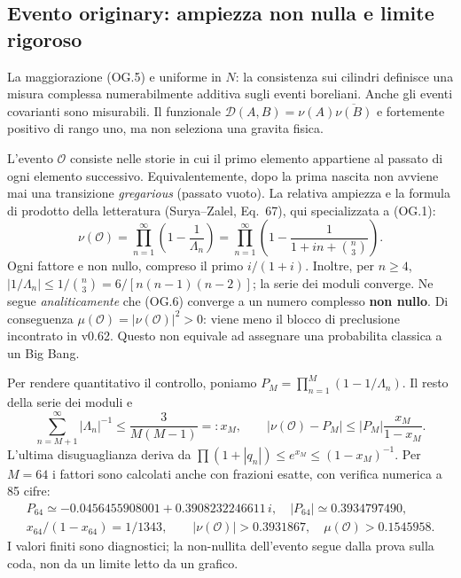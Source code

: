 \documentclass[11pt,a4paper]{article}
\begin{document}
\subsection*{Evento originary: ampiezza non nulla e limite rigoroso}
La maggiorazione (OG.5) e uniforme in $N$: la consistenza sui cilindri definisce una misura complessa numerabilmente additiva sugli eventi boreliani. Anche gli eventi covarianti sono misurabili. Il funzionale $\mathcal D(A,B)=\nu(A)\overline{\nu(B)}$ e fortemente positivo di rango uno, ma non seleziona una gravita fisica.

L'evento $\mathcal O$ consiste nelle storie in cui il primo elemento appartiene al passato di ogni elemento successivo. Equivalentemente, dopo la prima nascita non avviene mai una transizione \emph{gregarious} (passato vuoto). La relativa ampiezza e la formula di prodotto della letteratura (Surya--Zalel, Eq.~67), qui specializzata a (OG.1):
\begin{equation}
\boxed{\nu(\mathcal O)=\prod_{n=1}^{\infty}\left(1-\frac1{\Lambda_n}\right)
=\prod_{n=1}^{\infty}\left(1-\frac1{1+in+\binom n3}\right).}\tag{OG.6}
\end{equation}
Ogni fattore e non nullo, compreso il primo $i/(1+i)$. Inoltre, per $n\ge4$,
$|1/\Lambda_n|\le1/\binom n3=6/[n(n-1)(n-2)]$; la serie dei moduli converge. Ne segue \emph{analiticamente} che (OG.6) converge a un numero complesso \textbf{non nullo}. Di conseguenza $\mu(\mathcal O)=|\nu(\mathcal O)|^2>0$: viene meno il blocco di preclusione incontrato in v0.62. Questo non equivale ad assegnare una probabilita classica a un Big Bang.

Per rendere quantitativo il controllo, poniamo $P_M=\prod_{n=1}^{M}(1-1/\Lambda_n)$. Il resto della serie dei moduli e
\begin{equation}
\sum_{n=M+1}^{\infty}|\Lambda_n|^{-1}\le\frac3{M(M-1)}=:x_M,
\qquad |\nu(\mathcal O)-P_M|\le |P_M|\frac{x_M}{1-x_M}.\tag{OG.7}
\end{equation}
L'ultima disuguaglianza deriva da $\prod(1+|q_n|)\le e^{x_M}\le(1-x_M)^{-1}$. Per $M=64$ i fattori sono calcolati anche con frazioni esatte, con verifica numerica a 85 cifre:
\begin{equation}
\begin{gathered}
 P_{64}\simeq-0.0456455908001+0.3908232246611\,i,\quad |P_{64}|\simeq0.3934797490,\\
 x_{64}/(1-x_{64})=1/1343,\qquad
 \boxed{|\nu(\mathcal O)|>0.3931867,\quad \mu(\mathcal O)>0.1545958.}
\end{gathered}\tag{OG.8}
\end{equation}
I valori finiti sono diagnostici; la non-nullita dell'evento segue dalla prova sulla coda, non da un limite letto da un grafico.
\end{document}
